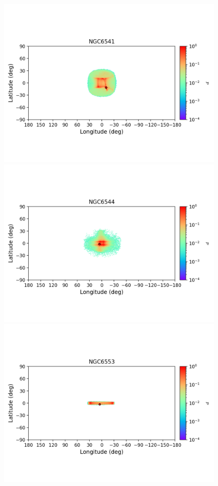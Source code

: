         \begin{figure}
        \includegraphics[clip=true, trim = 0mm 20mm 0mm 10mm, width=1\columnwidth]{images/error_plots_NGC6541.png}
        \includegraphics[clip=true, trim = 0mm 20mm 0mm 10mm, width=1\columnwidth]{images/error_plots_NGC6544.png}
        \includegraphics[clip=true, trim = 0mm 20mm 0mm 10mm, width=1\columnwidth]{images/error_plots_NGC6553.png}

\end{figure}
